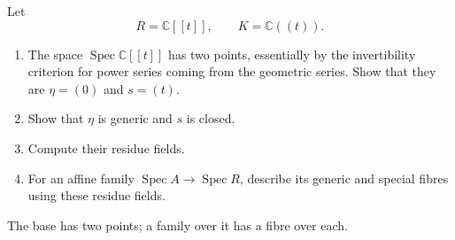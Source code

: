 \begin{exercise}
\label{example-two-point-base}
Let
$$
R=\mathbb{C}[[t]],\qquad
K=\mathbb{C}((t)).
$$
\begin{enumerate}
\item The space
$\operatorname{Spec}\mathbb{C}[[t]]$
has two points, essentially by the
invertibility criterion for power series
coming from the geometric series.
Show that they are $\eta=(0)$ and
$s=(t)$.
\item Show that $\eta$ is generic
and $s$ is closed.
\item Compute their residue fields.
\item For an affine family
$\operatorname{Spec}A\to
\operatorname{Spec}R$,
describe its generic and special
fibres using these residue fields.
\end{enumerate}
The base has two points; a family over
it has a fibre over each.
\end{exercise}

